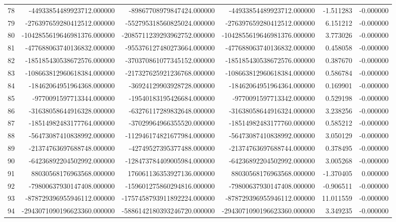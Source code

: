 \begin{tabular}{lrrrrr}
78 & -44933854489923712.000000 & -89867708979847424.000000 & -44933854489923712.000000 & -1.511283 & -0.000000 \\
79 & -276397659280412512.000000 & -552795318560825024.000000 & -276397659280412512.000000 & 6.151212 & -0.000000 \\
80 & -1042855619646981376.000000 & -2085711239293962752.000000 & -1042855619646981376.000000 & 3.773026 & -0.000000 \\
81 & -477688063740136832.000000 & -955376127480273664.000000 & -477688063740136832.000000 & 0.458058 & -0.000000 \\
82 & -185185430538672576.000000 & -370370861077345152.000000 & -185185430538672576.000000 & 0.387670 & -0.000000 \\
83 & -108663812960618384.000000 & -217327625921236768.000000 & -108663812960618384.000000 & 0.586784 & -0.000000 \\
84 & -18462064951964368.000000 & -36924129903928728.000000 & -18462064951964364.000000 & 0.169901 & -0.000000 \\
85 & -9770091597713344.000000 & -19540183195426684.000000 & -9770091597713342.000000 & 0.529198 & -0.000000 \\
86 & -31638058644916328.000000 & -63276117289832648.000000 & -31638058644916324.000000 & 3.238256 & -0.000000 \\
87 & -18514982483177764.000000 & -37029964966355520.000000 & -18514982483177760.000000 & 0.585212 & -0.000000 \\
88 & -56473087410838992.000000 & -112946174821677984.000000 & -56473087410838992.000000 & 3.050129 & -0.000000 \\
89 & -21374763697688748.000000 & -42749527395377488.000000 & -21374763697688744.000000 & 0.378495 & -0.000000 \\
90 & -64236892204502992.000000 & -128473784409005984.000000 & -64236892204502992.000000 & 3.005268 & -0.000000 \\
91 & 88030568176963568.000000 & 176061136353927136.000000 & 88030568176963568.000000 & -1.370405 & 0.000000 \\
92 & -79800637930147408.000000 & -159601275860294816.000000 & -79800637930147408.000000 & -0.906511 & -0.000000 \\
93 & -878729396955946112.000000 & -1757458793911892224.000000 & -878729396955946112.000000 & 11.011559 & -0.000000 \\
94 & -2943071090196623360.000000 & -5886142180393246720.000000 & -2943071090196623360.000000 & 3.349235 & -0.000000 \\

\end{tabular}
